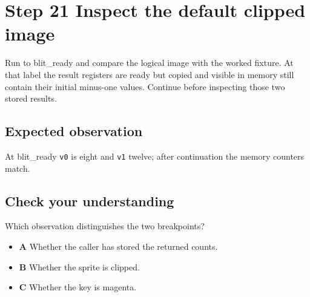 \section{Step 21 Inspect the default clipped image}\label{blit-s21}

Run to blit\_ready and compare the logical image with the worked fixture. At that label the result registers are ready but copied and visible in memory still contain their initial minus-one values. Continue before inspecting those two stored results.


\subsection{Expected observation}
At blit\_ready \texttt{v0} is eight and \texttt{v1} twelve; after continuation the memory counters match.

\subsection{Check your understanding}
Which observation distinguishes the two breakpoints?

\begin{itemize}
  \item \textbf{A} Whether the caller has stored the returned counts.
  \item \textbf{B} Whether the sprite is clipped.
  \item \textbf{C} Whether the key is magenta.
\end{itemize}
